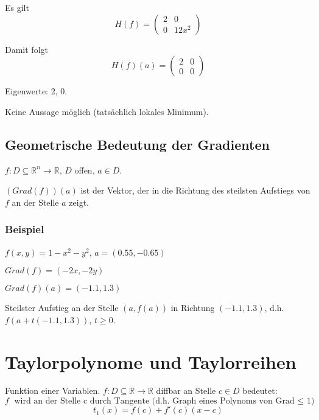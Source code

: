 \documentclass[a4paper, openany]{book}
\begin{document}
\begin{enumerate}[label=(\alph*)]
            Es gilt \[ H(f) = \begin{pmatrix}2 & 0 \\ 0 & 12x^2 \end{pmatrix}\]

            Damit folgt \[ H(f)(a) = \begin{pmatrix}2 & 0 \\ 0 & 0 \end{pmatrix} \]

            Eigenwerte: 2, 0.

            \par \medskip

            Keine Aussage möglich (tatsächlich lokales Minimum).
          \end{enumerate}
         
         \section{Geometrische Bedeutung der Gradienten}

         $f: D \subseteq \mathbb{R}^n \rightarrow \mathbb{R}$, $D$ offen, $a \in D$.

         \par \medskip

         $(Grad(f))(a)$ ist der Vektor, der in die Richtung des steilsten Aufstiegs von $f$ an der Stelle $a$ zeigt.

         \subsection{Beispiel}

         $f(x,y) = 1-x^2-y^2$, $a = (0.55,-0.65)$

         \par \medskip

         $Grad(f) = (-2x,-2y)$

         $Grad(f)(a) = (-1.1,1.3)$

         \par \medskip

         Steilster Aufstieg an der Stelle $(a,f(a))$ in Richtung $(-1.1,1.3)$, d.h. $f(a+t(-1.1,1.3))$, $t \ge 0$.

         \chapter{Taylorpolynome und Taylorreihen}

         Funktion einer Variablen. $f: D \subseteq \mathbb{R} \rightarrow \mathbb{R}$ diffbar an Stelle $c \in D$ bedeutet: \[ f \text{ wird an der Stelle c durch Tangente (d.h. Graph eines Polynoms von Grad $\le$ 1)} \] \[ t_1(x) = f(c) + f'(c)(x-c)\]
\end{document}
